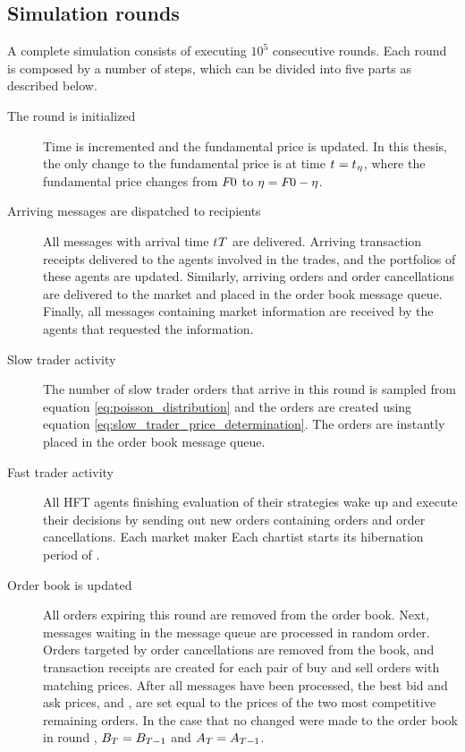 \subsection{Simulation rounds}
A complete simulation consists of executing $10^5$ consecutive rounds. Each round is composed by a number of steps, which can be divided into five parts as described below.
\begin{description}
\item[The round is initialized] Time is incremented and the fundamental price is updated. In this thesis, the only change to the fundamental price is at time $t_{} = t_{}{_\eta}$, where the fundamental price changes from $F_{}{0}$ to $\eta = F_{}{0} - \eta$.
\item[Arriving messages are dispatched to recipients] All messages with arrival time $t_{}{T}$ are delivered. Arriving transaction receipts delivered to the agents involved in the trades, and the portfolios of these agents are updated. Similarly, arriving orders and order cancellations are delivered to the market and placed in the order book message queue. Finally, all messages containing market information are received by the agents that requested the information. 
\item[Slow trader activity] The number of slow trader orders that arrive in this round is sampled from equation \ref{eq:poisson_distribution} and the orders are created using equation \ref{eq:slow_trader_price_determination}. The orders are instantly placed in the order book message queue.
\item[Fast trader activity] All HFT agents finishing evaluation of their strategies wake up and execute their decisions by sending out new orders containing orders and order cancellations. Each market maker  Each chartist  starts its hibernation period of .
\item[Order book is updated] All orders expiring this round are removed from the order book. Next, messages waiting in the message queue are processed in random order. Orders targeted by order cancellations are removed from the book, and transaction receipts are created for each pair of buy and sell orders with matching prices. After all messages have been processed, the best bid and ask prices,  and , are set equal to the prices of the two most competitive remaining orders. In the case that no changed were made to the order book in round , $B_{T} = B_{T-1}$ and $A_{T} = A_{T-1}$.
\end{description}


